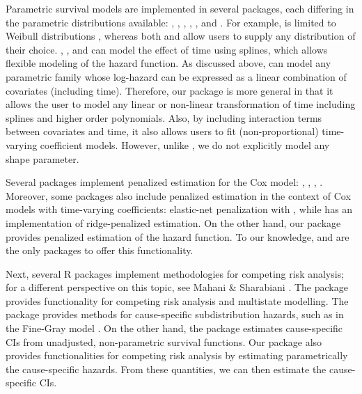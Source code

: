 Parametric survival models are implemented in several packages, each
differing in the parametric distributions available: 
\citeyearpar{mahani2015bayesian}, 
\citeyearpar{flexsurv}, 
\citeyearpar{smoothHazard},  \citeyearpar{clements_liu},
 \citeyearpar{scheike2014estimating}, and
 \citeyearpar{survival-package}. For example,
 is limited to Weibull distributions
\citeyearpar{smoothHazard}, whereas both  and
 allow users to supply any distribution of their choice.
, ,  and  can
model the effect of time using splines, which allows flexible modeling
of the hazard function. As discussed above,  can model any
parametric family whose log-hazard can be expressed as a linear
combination of covariates (including time). Therefore, our package is
more general in that it allows the user to model any linear or
non-linear transformation of time including splines and higher order
polynomials. Also, by including interaction terms between covariates and
time, it also allows users to fit (non-proportional) time-varying
coefficient models. However, unlike , we do not explicitly
model any shape parameter.

Several packages implement penalized estimation for the Cox model:
 \citeyearpar{regpathcox}, 
\citeyearpar{park_hastie},  \citeyearpar{l1penal},
 \citeyearpar{gerds_blanche}. Moreover, some
packages also include penalized estimation in the context of Cox models
with time-varying coefficients: elastic-net penalization with
 \citeyearpar{clements_liu}, while 
\citeyearpar{survival-package} has an implementation of ridge-penalized
estimation. On the other hand, our package  provides
penalized estimation of the hazard function. To our knowledge,
 and  are the only packages to offer this
functionality.

Next, several R packages implement methodologies for competing risk
analysis; for a different perspective on this topic, see Mahani \&
Sharabiani \citeyearpar{mahani2015bayesian}. The package 
provides functionality for competing risk analysis and multistate
modelling. The package  provides methods for
cause-specific subdistribution hazards, such as in the Fine-Gray model
\citeyearpar{fine1999proportional}. On the other hand, the package
 estimates cause-specific CIs from unadjusted, non-parametric
survival functions. Our package  also provides
functionalities for competing risk analysis by estimating parametrically
the cause-specific hazards. From these quantities, we can then estimate
the cause-specific CIs.

